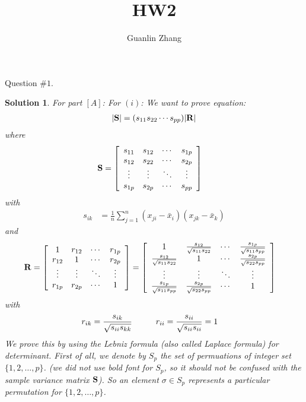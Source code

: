 \documentclass[11pt]{article}
\title{HW2}
\author{Guanlin Zhang}
\newtheorem{sol}{Solution}
\begin{document}
Question $\# 1$.
\begin{sol}
	For part $[A]$:\vskip 2mm
	For $(i)$:\vskip 2mm
	We want to prove equation:
	\begin{align*}
		|{\bf S}| = (s_{11}s_{22}\cdots s_{pp})|{\bf R}|
	\end{align*}
	where
	\begin{align*}
		{\bf S} &= \left[\begin{array}{cccc} s_{11}&s_{12}&\cdots&s_{1p}\\ s_{12}&s_{22}&\cdots&s_{2p}\\ \vdots&\vdots&\ddots&\vdots\\ s_{1p}&s_{2p}&\cdots&s_{pp}\end{array}\right]
	\end{align*}
	with
	\begin{align*}
		s_{ik} &= \frac{1}{n}\sum_{j = 1}^{n}(x_{ji} - \bar{x}_i)(x_{jk} - \bar{x}_k)
	\end{align*}
	and
	\begin{align*}
		{\bf R} &= \left[\begin{array}{cccc} 1&r_{12}&\cdots&r_{1p}\\ r_{12}&1&\cdots&r_{2p}\\ \vdots&\vdots&\ddots&\vdots\\ r_{1p}&r_{2p}&\cdots&1\end{array}\right] = \left[\begin{array}{cccc} 1&\frac{s_{12}}{\sqrt{s_{11}s_{22}}}&\cdots&\frac{s_{1p}}{\sqrt{s_{11}s_{pp}}}\\ \frac{s_{12}}{\sqrt{s_{11}s_{22}}}&1&\cdots&\frac{s_{2p}}{\sqrt{s_{22}s_{pp}}}\\ \vdots&\vdots&\ddots&\vdots\\ \frac{s_{1p}}{\sqrt{s_{11}s_{pp}}}&\frac{s_{2p}}{\sqrt{s_{22}s_{pp}}}&\cdots&1\end{array}\right]
	\end{align*}
	with
	\begin{align*}
		r_{ik} &= \frac{s_{ik}}{\sqrt{s_{ii}s_{kk}}} \hskip 1cm r_{ii} = \frac{s_{ii}}{\sqrt{s_{ii}s_{ii}}} = 1
	\end{align*}
	We prove this by using the Lebniz formula (also called Laplace formula) for determinant.\vskip 2mm
	First of all, we denote by $S_p$ the set of permuations of integer set $\{1, 2, \ldots, p\}$. (we did not use bold font for $S_p$, so it should not be confused with the sample variance matrix ${\bf S}$).\vskip 2mm
	So an element $\sigma \in S_p$ represents a particular permutation for $\{1, 2, \ldots, p\}$. \vskip 2mm

\end{sol}
\end{document}
